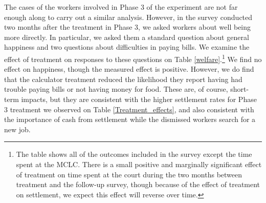 \documentclass[11pt, a4paper]{article}
\begin{document}
  The cases of the workers involved in Phase 3 of the experiment are not far enough along to carry out a similar analysis. However, in the survey conducted two months after the treatment in Phase 3, we asked workers about well being more directly. In particular, we asked them a standard question about general happiness and two questions about difficulties in paying bills. We examine the effect of treatment on responses to these questions on Table \ref{welfare}.\footnote{The table shows all of the outcomes included in the survey except the time spent at the MCLC. There is a small positive and marginally significant effect of treatment on time spent at the court during the two months between treatment and the follow-up survey, though because of the effect of treatment on settlement, we expect this effect will reverse over time.} We find no effect on happiness, though the measured effect is positive. However, we do find that the calculator treatment reduced the likelihood they report having had trouble paying bills or not having money for food. These are, of course, short-term impacts, but they are consistent with the higher settlement rates for Phase 3 treatment we observed on Table \ref{Treatment_effects}, and also consistent with the importance of cash from settlement while the dismissed workers search for a new job.   
 
  
\end{document}
